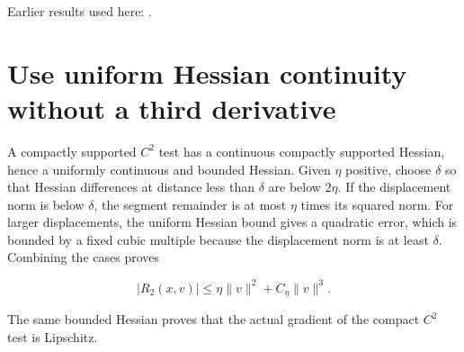 \documentclass[11pt,a4paper]{article}
\begin{document}
Earlier results used here: \cite[Section~3.55.1]{LangevinLean2026ULASC}.

\section{\texorpdfstring{Use uniform Hessian continuity without a third derivative}{Use uniform Hessian continuity without a third derivative}}


A compactly supported \(C^{2}\) test has a continuous compactly supported Hessian, hence a uniformly continuous and bounded Hessian. Given \(\eta\) positive, choose \(\delta\) so that Hessian differences at distance less than \(\delta\) are below \(2\eta\). If the displacement norm is below \(\delta\), the segment remainder is at most \(\eta\) times its squared norm. For larger displacements, the uniform Hessian bound gives a quadratic error, which is bounded by a fixed cubic multiple because the displacement norm is at least \(\delta\). Combining the cases proves

\[|R_2(x,v)|\le\eta\|v\|^2+C_\eta\|v\|^3.\]

The same bounded Hessian proves that the actual gradient of the compact \(C^{2}\) test is Lipschitz.
\end{document}

